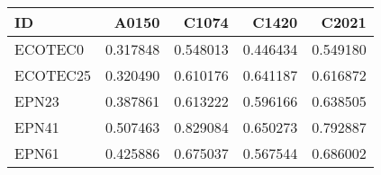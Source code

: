 \begin{tabular}{lrrrr}
\toprule
      ID &    A0150 &    C1074 &    C1420 &    C2021 \\
\midrule
 ECOTEC0 & 0.317848 & 0.548013 & 0.446434 & 0.549180 \\
ECOTEC25 & 0.320490 & 0.610176 & 0.641187 & 0.616872 \\
   EPN23 & 0.387861 & 0.613222 & 0.596166 & 0.638505 \\
   EPN41 & 0.507463 & 0.829084 & 0.650273 & 0.792887 \\
   EPN61 & 0.425886 & 0.675037 & 0.567544 & 0.686002 \\
\bottomrule
\end{tabular}
